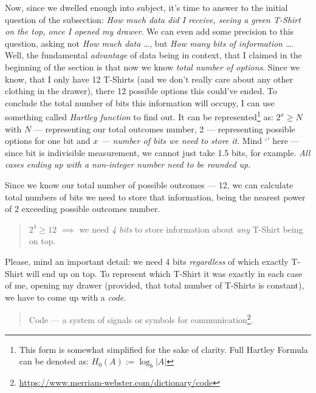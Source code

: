 \documentclass{report}
\begin{document}
            Now, since we dwelled enough into subject, it's time to answer to the initial question of the subsection: \emph{How much data did I receive, seeing a green 
            T-Shirt on the top, once I opened my drawer}. We can even add some precision to this question, asking not \emph{How much data \ldots}, but \emph{How many bits of information \ldots}.
            Well, the fundamental \emph{advantage} of data being in context, that I claimed in the beginning of the section is that now we know \emph{total number of options}.
            Since we know, that I only have 12 T-Shirts (and we don't really care about any other clothing in the drawer), there 12 possible options this could've ended. To 
            conclude the total number of bits this information will occupy, I can use something called \emph{Hartley function} to find out. It can be 
            represented\footnote{This form is somewhat simplified for the sake of clarity. Full Hartley Formula can be denoted as: $H_0(A) := \log_b|A|$}
            as: $2^x \geq N$ with $N$ --- representing our total outcomes number, 2 --- representing possible options for one bit and 
            \emph{$x$ --- number of bits we need to store it}.
            Mind `\geq' here --- since bit is indivisible measurement, we cannot just take 1.5 bits, for example.
            \emph{All cases ending up with a non-integer number need to be rounded up}. \par

            Since we know our total number of possible outcomes --- 12, we can calculate total numbers of bits we need to store that information, being the nearest power of 2
            exceeding possible outcomes number.
            
            \begin{quote}
                $2^4 \geq 12$ $\implies$ we need \emph{4 bits} to store information about \emph{any} T-Shirt being on top.
            \end{quote}

            Please, mind an important detail: we need 4 bits \emph{regardless} of which exactly T-Shirt will end up on top. To represent which T-Shirt it was exactly
            in each case of me, opening my drawer (provided, that total number of T-Shirts is constant), we have to come up with a \emph{code}.

            \begin{quote}
                Code --- a system of signals or symbols for communication\footnote{\href{https://www.merriam-webster.com/dictionary/code}{https://www.merriam-webster.com/dictionary/code}}.
            \end{quote}
\end{document}
